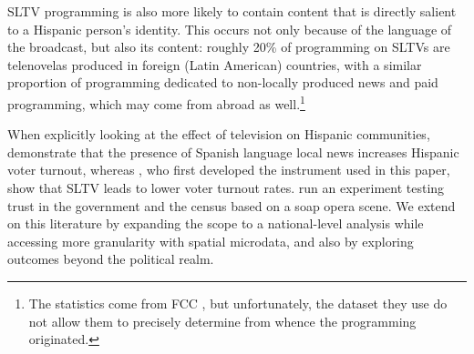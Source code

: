 \documentclass[11pt]{article}
\begin{document}
SLTV programming is also more likely to contain content that is directly salient to a Hispanic person's identity. This occurs not only because of the language of the broadcast, but also its content: roughly 20\% of programming on SLTVs are telenovelas produced in foreign (Latin American) countries, with a similar proportion of programming dedicated to non-locally produced news and paid programming, which may come from abroad as well.\footnote{ The statistics come from FCC \cite{noauthor_hispanic_2016}, but unfortunately, the dataset they use do not allow them to precisely determine from whence the programming originated. }

When explicitly looking at the effect of television on Hispanic communities, \cite{oberholzer-gee_media_2009} demonstrate that the presence of Spanish language local news increases Hispanic voter turnout, whereas  \cite{velez_tuning_2019}, who first developed the instrument used in this paper, show that SLTV leads to lower voter turnout rates. \cite{trujillo_devil_2012} run an experiment testing trust in the government and the census based on a soap opera scene. We extend on this literature by expanding the scope to a national-level analysis while accessing more granularity with spatial microdata, and also by exploring outcomes beyond the political realm.


\end{document}

